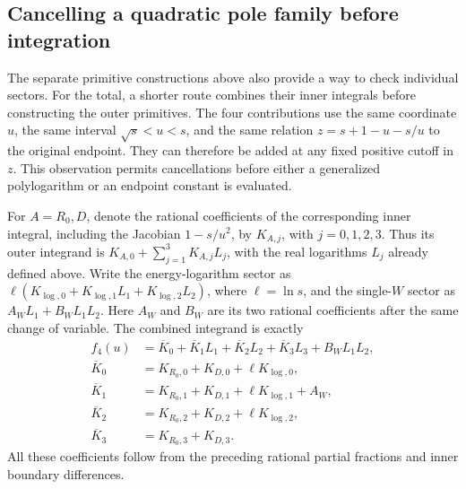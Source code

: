 \subsection{Cancelling a quadratic pole family before integration}
\label{sec:comp-real-kernel-collection}
The separate primitive constructions above also provide a way to check
individual sectors. For the total, a shorter route combines their inner
integrals before constructing the outer primitives. The four contributions
use the same coordinate $u$, the same interval $\sqrt{s}<u<s$, and the
same relation $z=s+1-u-s/u$ to the original endpoint. They can therefore
be added at any fixed positive cutoff in $z$. This observation permits
cancellations before either a generalized polylogarithm or an endpoint
constant is evaluated.

For $A=R_0,D$, denote the rational coefficients of the corresponding
inner integral, including the Jacobian $1-s/u^2$, by $K_{A,j}$, with
$j=0,1,2,3$. Thus its outer integrand is
$K_{A,0}+\sum_{j=1}^3K_{A,j}L_j$, with the real logarithms $L_j$
already defined above. Write the energy-logarithm sector as
$\ell(K_{\log,0}+K_{\log,1}L_1+K_{\log,2}L_2)$, where
$\ell=\ln s$, and the single-$W$ sector as $A_WL_1+B_WL_1L_2$.
Here $A_W$ and $B_W$ are its two rational coefficients after the same
change of variable. The combined integrand is exactly
\begin{align}
 f_4(u)&=\overline K_0+\overline K_1L_1+
             \overline K_2L_2+\overline K_3L_3+B_WL_1L_2,\\
 \overline K_0&=K_{R_0,0}+K_{D,0}+\ell K_{\log,0},\\
 \overline K_1&=K_{R_0,1}+K_{D,1}+\ell K_{\log,1}+A_W,\\
 \overline K_2&=K_{R_0,2}+K_{D,2}+\ell K_{\log,2},\\
 \overline K_3&=K_{R_0,3}+K_{D,3}.
 \label{eq:comp-real-combined-kernel}
\end{align}
All these coefficients follow from the preceding rational partial
fractions and inner boundary differences.


